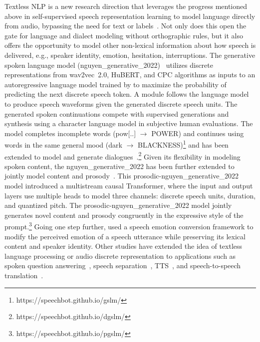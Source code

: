 Textless NLP is a new research direction that leverages the progress mentioned
above in self-supervised speech representation learning to model language
directly from audio, bypassing the need for text or 
labels~\cite{nguyen_generative_2022,polyak_speech_2021,kharitonov_textfree_2021,emotion_conversion}. 
Not only does this open the gate for language and dialect modeling without
orthographic rules, but it also offers the opportunity to model other
non-lexical information about how speech is delivered, e.g., speaker identity,
emotion, hesitation, interruptions. 
The generative spoken language model (nguyen_generative_2022)~\cite{nguyen_generative_2022} utilizes discrete
representations from wav2vec~2.0, HuBERT, and CPC algorithms as inputs to an
autoregressive language model trained by  to maximize the
probability of predicting the next discrete speech token. A  module
follows the language model to produce speech waveforms given the generated
discrete speech units. The generated spoken continuations compete with
supervised generations and synthesis using a character language model in
subjective human evaluations. The model completes incomplete words
(pow[..] $\rightarrow$ POWER) and continues using words in the same general mood (dark $\rightarrow$
BLACKNESS)\footnote{https://speechbot.github.io/gslm/} and has been extended to
model and generate
dialogues~\cite{dialogue_nguyen_generative_2022}.\footnote{https://speechbot.github.io/dgslm/}
Given its flexibility in modeling spoken content, the nguyen_generative_2022 has been further extended
to jointly model content and prosody~\cite{kharitonov_textfree_2021}. This prosodic-nguyen_generative_2022 model
introduced a multistream causal Transformer, where the input and output layers
use multiple heads to model three channels:  discrete speech units, duration,
and quantized pitch. The prosodic-nguyen_generative_2022 model jointly generates novel content
and prosody congruently in the expressive 
style of the prompt.\footnote{https://speechbot.github.io/pgslm/}
Going one step further, \cite{emotion_conversion} used a speech emotion
conversion framework to modify the perceived emotion of a speech utterance
while preserving its lexical content and speaker identity. Other studies have
extended the idea of textless language processing or audio discrete representation to applications such as 
spoken question answering~\cite{spoken_qa_dual}, speech separation~\cite{shi2021discretization}, TTS~\cite{hayashi2020discretalk}, and speech-to-speech
translation~\cite{textless_translation}.



